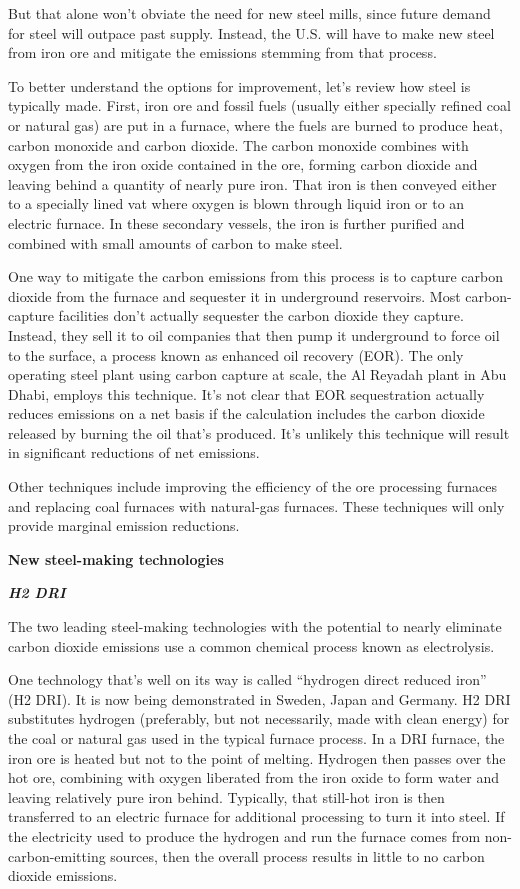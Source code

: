 \documentclass[
]{book}
\begin{document}
But that alone won't obviate the need for new steel mills, since future demand for steel will outpace past supply. Instead, the U.S. will have to make new steel from iron ore and mitigate the emissions stemming from that process.

To better understand the options for improvement, let's review how steel is typically made. First, iron ore and fossil fuels (usually either specially refined coal or natural gas) are put in a furnace, where the fuels are burned to produce heat, carbon monoxide and carbon dioxide. The carbon monoxide combines with oxygen from the iron oxide contained in the ore, forming carbon dioxide and leaving behind a quantity of nearly pure iron. That iron is then conveyed either to a specially lined vat where oxygen is blown through liquid iron or to an electric furnace. In these secondary vessels, the iron is further purified and combined with small amounts of carbon to make steel.

One way to mitigate the carbon emissions from this process is to capture carbon dioxide from the furnace and sequester it in underground reservoirs.
Most carbon-capture facilities don't actually sequester the carbon dioxide they capture. Instead, they sell it to oil companies that then pump it underground to force oil to the surface, a process known as enhanced oil recovery (EOR).
The only operating steel plant using carbon capture at scale, the Al Reyadah plant in Abu Dhabi, employs this technique.
It's not clear that EOR sequestration actually reduces emissions on a net basis if the calculation includes the carbon dioxide released by burning the oil that's produced.
It's unlikely this technique will result in significant reductions of net emissions.

Other techniques include improving the efficiency of the ore processing furnaces and replacing coal furnaces with natural-gas furnaces. These techniques will only provide marginal emission reductions.

\textbf{New steel-making technologies}

\textbf{\emph{H2 DRI}}

The two leading steel-making technologies with the potential to nearly eliminate carbon dioxide emissions use a common chemical process known as electrolysis.

One technology that's well on its way is called ``hydrogen direct reduced iron'' (H2 DRI). It is now being demonstrated in Sweden, Japan and Germany. H2 DRI substitutes hydrogen (preferably, but not necessarily, made with clean energy) for the coal or natural gas used in the typical furnace process. In a DRI furnace, the iron ore is heated but not to the point of melting. Hydrogen then passes over the hot ore, combining with oxygen liberated from the iron oxide to form water and leaving relatively pure iron behind. Typically, that still-hot iron is then transferred to an electric furnace for additional processing to turn it into steel. If the electricity used to produce the hydrogen and run the furnace comes from non-carbon-emitting sources, then the overall process results in little to no carbon dioxide emissions.
\end{document}
